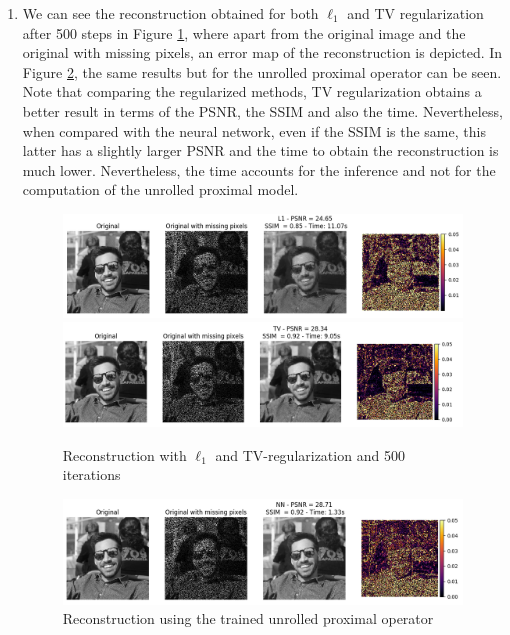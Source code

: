 \documentclass{article}
\begin{document}
\begin{enumerate}[label=2.\arabic*]
    \item
    
    We can see the reconstruction obtained for both $\ell_1$ and TV regularization after 500 steps in Figure \ref{fig:rec_500}, where apart from the original image and the original with missing pixels, an error map of the reconstruction is depicted. In Figure \ref{fig:rec_nn}, the same results but for the unrolled proximal operator can be seen. Note that comparing the regularized methods, TV regularization obtains a better result in terms of the PSNR, the SSIM and also the time. Nevertheless, when compared with the neural network, even if the SSIM is the same, this latter has a slightly larger PSNR and the time to obtain the reconstruction is much lower. Nevertheless, the time accounts for the inference and not for the computation of the unrolled proximal model.
    
    \begin{figure}[H]
        \centering
        \includegraphics[trim={.5cm .5cm 0cm 0cm},clip,width=\textwidth]{img/reconstruction_l1.png}
        \includegraphics[trim={.5cm .5cm .5cm 0cm},clip,width=\textwidth]{img/reconstruction_tv.png}
        \caption{Reconstruction with $\ell_1$ and TV-regularization and 500 iterations}
        \label{fig:rec_500}
    \end{figure}
    \begin{figure}[H]
        \centering
        \includegraphics[trim={.5cm .5cm .5cm 0cm},clip,width=\textwidth]{img/reconstruction_nn.png}
        \caption{Reconstruction using the trained unrolled proximal operator}
        \label{fig:rec_nn}
    \end{figure}
    

\end{enumerate}
\end{document}
